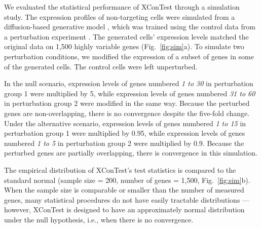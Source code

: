 \documentclass[11pt]{article}
\begin{document}
We evaluated the statistical performance of XConTest through a simulation study. The expression profiles of non-targeting cells were simulated from a diffusion-based generative model \cite{shang2025predicting}, which was trained using the control data from a perturbation experiment \cite{yao2024scalable}. The generated cells' expression levels matched the original data on 1,500 highly variable genes (Fig.~\ref{fig:sim}a). To simulate two perturbation conditions, we modified the expression of a subset of genes in some of the generated cells. The control cells were left unperturbed. 

In the null scenario, expression levels of genes numbered \textit{1 to 30} in perturbation group 1 were multiplied by 5, while expression levels of genes numbered \textit{31 to 60} in perturbation group 2 were modified in the same way. Because the perturbed genes are non-overlapping, there is no convergence despite the five-fold change. Under the alternative scenario, expression levels of genes numbered \textit{1 to 15} in perturbation group 1 were multiplied by 0.95, while expression levels of genes numbered \textit{1 to 5} in perturbation group 2 were multiplied by 0.9. Because the perturbed genes are partially overlapping, there is convergence in this simulation.

The empirical distribution of XConTest's test statistics is compared to the standard normal (sample size = 200, number of genes = 1,500, Fig.~\ref{fig:sim}b). When the sample size is comparable or smaller than the number of measured genes, many statistical procedures do not have easily tractable distributions 
---however, XConTest is designed to have an approximately normal distribution under the null hypothesis, i.e., when there is no convergence.
\end{document}
